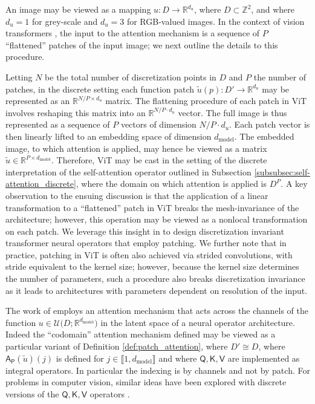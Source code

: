 \documentclass[twoside]{article}
\newcommand{\1}{\mathbbm{1}}
\newcommand{\R}{\mathbbm{R}}
\newcommand{\Z}{\mathbbm{Z}}
\newcommand{\cU}{\mathcal{U}}
\newcommand{\sAp}{\mathsf{A}_{\mathsf{P}}}
\newcommand{\sQ}{\mathsf{Q}}
\newcommand{\sK}{\mathsf{K}}
\newcommand{\sV}{\mathsf{V}}
\newcommand{\range}[2]{\llbracket #1, #2 \rrbracket}
\providecommand{\mathbbm}{\mathbb} %
\begin{document}
\begin{remark}
\label{rm:patch_vit}
    An image may be viewed as a mapping $u: D \to \R^{d_u}$, where $D\subset \Z^2$, and where $d_u=1$ for grey-scale and $d_u=3$ for RGB-valued images.  In the context of vision transformers \citep{dosovitskyi2021image}, the input to the attention mechanism is a sequence of $P$ ``flattened'' patches of the input image; we next outline the details to this procedure. 
    
    Letting $N$ be the total number of discretization points in $D$ and $P$ the number of patches, in the discrete setting each function patch $\widetilde{u}(p):D'\to \R^{d_u}$ may be represented as an $\R^{N/P \times d_u}$ matrix. The flattening procedure of each patch in ViT involves reshaping this matrix into an $\R^{N/P \cdot d_u}$ vector. The full image is thus represented as a sequence of $P$ vectors of dimension $N/P \cdot d_u$. Each patch vector is then linearly lifted to an embedding space of dimension $d_{\textrm{model}}$. The embedded image, to which attention is applied, may hence be viewed as a matrix $\widetilde{u}\in\R^{P\times d_{\textrm{model}}}$. Therefore, ViT may be cast in the setting of the discrete interpretation of the self-attention operator outlined in Subsection \ref{subsubsec:self-attention_discrete}, where the domain on which attention is applied is $D^P$. A key observation to the ensuing discussion is that the application of a linear transformation to a ``flattened'' patch in ViT breaks the mesh-invariance of the architecture; however, this operation may be viewed as a nonlocal transformation on each patch. We leverage this insight in  to design discretization invariant transformer neural operators that employ patching. We further note that in practice, patching in ViT is often also achieved via strided convolutions, with stride equivalent to the kernel size; however, because the kernel size determines the number of parameters, such a procedure also breaks discretization invariance as it leads to architectures with parameters dependent on resolution of the input.

    
\end{remark}

\begin{remark}
\label{remark:codomain_attention}
The work of \citet{rahman2024pretraining} employs an attention mechanism that acts across the channels of the function $u\in \cU\bigl(D;\R^{d_{\textrm{model}}} \bigr)$ in the latent space of a neural operator architecture. Indeed the ``codomain'' attention mechanism defined may be viewed as a particular variant of Definition \ref{def:patch_attention}, where $D'\cong D$, where $\sAp(\widetilde{u})(j)$ is defined for $j \in \range{1}{d_{\textrm{model}}}$ and where $\sQ, \sK, \sV$ are implemented as integral operators. In
particular the indexing is by channels and not by patch. For problems in computer vision, similar ideas have been explored with discrete versions of the $\sQ, \sK, \sV$ operators \citep{chen2017sca}.
\end{remark}
\end{document}
